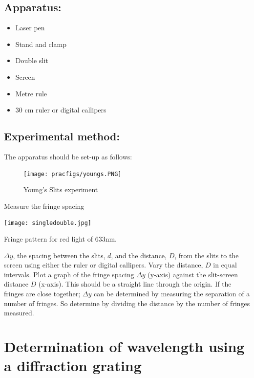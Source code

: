\subsection{Apparatus:}
\begin{itemize}
\item Laser pen 
\item Stand and clamp 
\item Double slit 
\item Screen 
\item Metre rule 
\item 30 cm ruler or digital callipers
\end{itemize}
\subsection{Experimental method:} 
The apparatus should be set-up as follows:   
\begin{figure}
\texttt{[image: pracfigs/youngs.PNG]}
\caption{Young's Slits experiment}
\end{figure}

Measure the fringe spacing
\begin{marginfigure}
\texttt{[image: singledouble.jpg]}
\caption{Fringe pattern for red light of 633nm.}
\end{marginfigure} $\Delta y$, the spacing between the slits, $d$, and the distance, $D$, from the slits to the screen using either the ruler or digital callipers.  Vary the distance, $D$ in equal intervals. Plot a graph of the fringe spacing $\Delta y$ (y-axis) against the slit-screen distance $D$  (x-axis). This should be a straight line through the origin.  
If the fringes are close together; $\Delta y$ can be determined by measuring the separation of a number of fringes. So determine by dividing the distance by the number of fringes measured.   
\section{Determination of wavelength using a diffraction grating}
